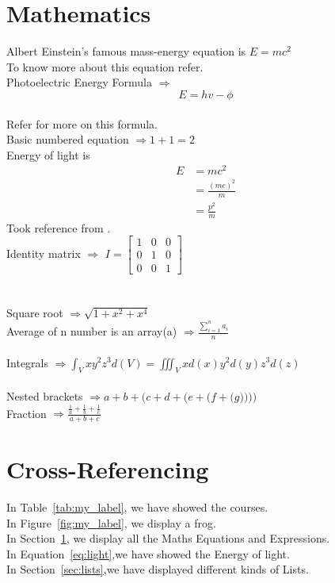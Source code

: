 \documentclass[12pt]{article}%
\begin{document}
\section{Mathematics} \label{sec:maths}
{Albert Einstein's famous mass-energy equation is $E=m{c}^2$}\\
To know more about this equation refer\cite{bodanis2000mc2}.\\
{Photoelectric Energy Formula $\Rightarrow$ $$ E = hv - \phi $$}\\
Refer \cite{smoluchowski1941anisotropy} for more on this formula.\\
{Basic numbered equation $\Rightarrow 1 + 1 = 2$}\\
Energy of light is
\begin{align} \label{eq:light}
E &= mc^2\\
&= \frac{(mc)^2}{m}\\
&= \frac{p^2}{m}
\end{align}
Took reference from \cite{irodov1991problems}.\\
Identity matrix $\Rightarrow$
$I = \begin{bmatrix}
       1 & 0 & 0 \\[0.3em]
       0 & 1 & 0 \\[0.3em]
       0 & 0 & 1
     \end{bmatrix}$\\
\\
\\Square root 
$\Rightarrow \sqrt{1+x^2+x^4}$\\
Average of n number is an array(a) 
$\Rightarrow 
\frac{
\displaystyle\sum_{i=1}^{n} a_i}{n}$\\
\\Integrals 
$\Rightarrow \int_V xy^2z^3 d(V) = \iiint_V xd(x) y^2d(y) z^3d(z) $\\
\\Nested brackets 
$\Rightarrow a + b + \Bigg( c + d +\bigg( e + \Big( f + \big( g \big) \Big) \bigg) \Bigg) $
\\Fraction $\Rightarrow \frac{\frac{1}{a}+\frac{1}{b}+\frac{1}{c}}{a+b+c}$\\

\section{Cross-Referencing}
In Table~\ref{tab:my_label}, we have showed the courses.\\
In Figure~\ref{fig:my_label}, we display a frog.\\
In Section~\ref{sec:maths}, we display all the Maths Equations and Expressions.\\
In Equation~\ref{eq:light},we have showed the Energy of light.\\
In Section~\ref{sec:lists},we have displayed different kinds of Lists.\\
\end{document}
